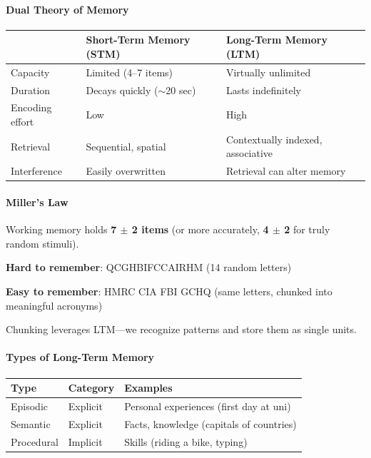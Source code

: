 \paragraph*{Dual Theory of Memory}

\begin{center}
\renewcommand{\arraystretch}{1.3}
\begin{tabular}{@{} l p{5cm} p{5cm} @{}}
\toprule
& \textbf{Short-Term Memory (STM)} & \textbf{Long-Term Memory (LTM)} \\
\midrule
Capacity & Limited (4--7 items) & Virtually unlimited \\
Duration & Decays quickly ($\sim$20 sec) & Lasts indefinitely \\
Encoding effort & Low & High \\
Retrieval & Sequential, spatial & Contextually indexed, associative \\
Interference & Easily overwritten & Retrieval can alter memory \\
\bottomrule
\end{tabular}
\end{center}

\paragraph*{Miller's Law}
Working memory holds \textbf{7 $\pm$ 2 items} (or more accurately, \textbf{4 $\pm$ 2} for truly random stimuli).

\begin{exbox}[Chunking]
\textbf{Hard to remember}: QCGHBIFCCAIRHM (14 random letters)

\textbf{Easy to remember}: HMRC CIA FBI GCHQ (same letters, chunked into meaningful acronyms)

Chunking leverages LTM---we recognize patterns and store them as single units.
\end{exbox}

\paragraph*{Types of Long-Term Memory}

\begin{center}
\renewcommand{\arraystretch}{1.2}
\begin{tabular}{@{} l l l @{}}
\toprule
\textbf{Type} & \textbf{Category} & \textbf{Examples} \\
\midrule
Episodic & Explicit & Personal experiences (first day at uni) \\
Semantic & Explicit & Facts, knowledge (capitals of countries) \\
Procedural & Implicit & Skills (riding a bike, typing) \\
\bottomrule
\end{tabular}
\end{center}

